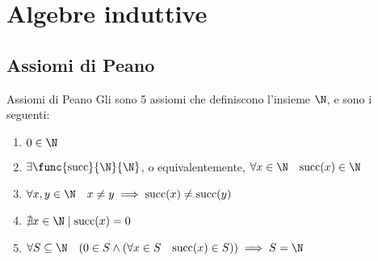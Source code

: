 \documentclass[a4paper, 12pt]{report}
\begin{document}
    \section{Algebre induttive}

    \subsection{Assiomi di Peano}

    \begin{frameddefn}[label={peano}]{Assiomi di Peano}
        Gli  sono 5 assiomi che definiscono l'insieme $\N$, e sono i seguenti:

        \begin{enumerate}[label=\roman*), font=\itshape]
            \item $0 \in \N$
            \item $\exists \func{\mathrm{succ}}{\N}{\N}$, o equivalentemente, $\forall x \in \N \quad \mathrm{succ}(x) \in \N$
            \item $\forall x, y \in \N \quad x \neq y \implies \mathrm{succ}(x) \neq \mathrm{succ}(y)$
            \item $\nexists x \in \N \mid \mathrm{succ}(x) = 0$
            \item $\forall S \subseteq \N \quad (0 \in S \land (\forall x \in S \quad \mathrm{succ}(x) \in S)) \implies S = \N$
        \end{enumerate}
    \end{frameddefn}
\end{document}
